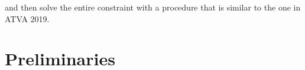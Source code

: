 \documentclass[sigplan,review,anonymous]{acmart}\settopmatter{printfolios=true,printccs=false,printacmref=false}
\begin{document}
and then solve the entire constraint with a procedure that is similar to the one in ATVA 2019.






\section{Preliminaries} \label{section:preliminary}
%

\end{document}
